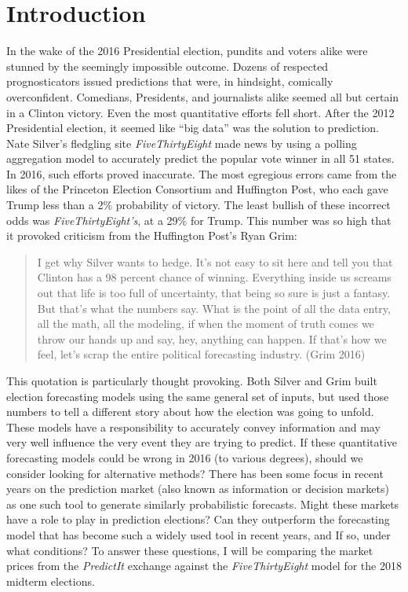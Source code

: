 \documentclass[11pt,]{article}
\begin{document}
\vskip 6.5pt

{
\hypersetup{linkcolor=black}
\setcounter{tocdepth}{2}
\tableofcontents
}

\noindent \doublespacing \hypertarget{introduction}{%
\section{Introduction}\label{introduction}}

In the wake of the 2016 Presidential election, pundits and voters alike
were stunned by the seemingly impossible outcome. Dozens of respected
prognosticators issued predictions that were, in hindsight, comically
overconfident. Comedians, Presidents, and journalists alike seemed all
but certain in a Clinton victory. Even the most quantitative efforts
fell short. After the 2012 Presidential election, it seemed like ``big
data'' was the solution to prediction. Nate Silver's fledgling site
\emph{FiveThirtyEight} made news by using a polling aggregation model to
accurately predict the popular vote winner in all 51 states. In 2016,
such efforts proved inaccurate. The most egregious errors came from the
likes of the Princeton Election Consortium and Huffington Post, who each
gave Trump less than a 2\% probability of victory. The least bullish of
these incorrect odds was \emph{FiveThirtyEight's}, at a 29\% for Trump.
This number was so high that it provoked criticism from the Huffington
Post's Ryan Grim:

\begin{quote}
I get why Silver wants to hedge. It's not easy to sit here and tell you
that Clinton has a 98 percent chance of winning. Everything inside us
screams out that life is too full of uncertainty, that being so sure is
just a fantasy. But that's what the numbers say. What is the point of
all the data entry, all the math, all the modeling, if when the moment
of truth comes we throw our hands up and say, hey, anything can happen.
If that's how we feel, let's scrap the entire political forecasting
industry. (Grim 2016)
\end{quote}

This quotation is particularly thought provoking. Both Silver and Grim
built election forecasting models using the same general set of inputs,
but used those numbers to tell a different story about how the election
was going to unfold. These models have a responsibility to accurately
convey information and may very well influence the very event they are
trying to predict. If these quantitative forecasting models could be
wrong in 2016 (to various degrees), should we consider looking for
alternative methods? There has been some focus in recent years on the
prediction market (also known as information or decision markets) as one
such tool to generate similarly probabilistic forecasts. Might these
markets have a role to play in prediction elections? Can they outperform
the forecasting model that has become such a widely used tool in recent
years, and If so, under what conditions? To answer these questions, I
will be comparing the market prices from the \emph{PredictIt} exchange
against the \emph{FiveThirtyEight} model for the 2018 midterm elections.
\end{document}
